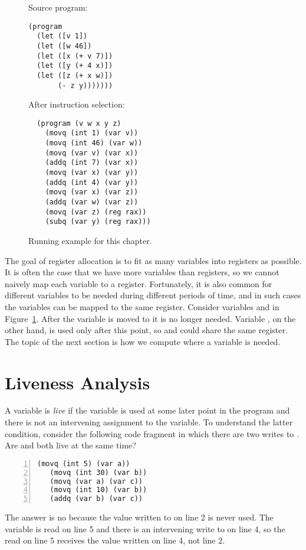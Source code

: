\documentclass[11pt]{book}
\begin{document}
\begin{figure}
\begin{minipage}{0.45\textwidth}
Source program:
\begin{lstlisting}
(program
  (let ([v 1])
  (let ([w 46])
  (let ([x (+ v 7)])
  (let ([y (+ 4 x)])
  (let ([z (+ x w)])
       (- z y)))))))
\end{lstlisting}
\end{minipage}
\begin{minipage}{0.45\textwidth}
After instruction selection:
\begin{lstlisting}
  (program (v w x y z)
    (movq (int 1) (var v))
    (movq (int 46) (var w))
    (movq (var v) (var x))
    (addq (int 7) (var x))
    (movq (var x) (var y))
    (addq (int 4) (var y))
    (movq (var x) (var z))
    (addq (var w) (var z))
    (movq (var z) (reg rax))
    (subq (var y) (reg rax)))
\end{lstlisting}
\end{minipage}
\caption{Running example for this chapter.}
\label{fig:reg-eg}
\end{figure}

The goal of register allocation is to fit as many variables into
registers as possible. It is often the case that we have more
variables than registers, so we cannot naively map each variable to a
register. Fortunately, it is also common for different variables to be
needed during different periods of time, and in such cases the
variables can be mapped to the same register.  Consider variables
 and  in Figure~\ref{fig:reg-eg}.  After the variable
 is moved to  it is no longer needed.  Variable
, on the other hand, is used only after this point, so
 and  could share the same register. The topic of the
next section is how we compute where a variable is needed.


\section{Liveness Analysis}
\label{sec:liveness-analysis}

A variable is \emph{live} if the variable is used at some later point
in the program and there is not an intervening assignment to the
variable.
%
To understand the latter condition, consider the following code
fragment in which there are two writes to . Are  and
 both live at the same time?
\begin{lstlisting}[numbers=left,numberstyle=\tiny]
   (movq (int 5) (var a))
   (movq (int 30) (var b))
   (movq (var a) (var c))
   (movq (int 10) (var b))
   (addq (var b) (var c))
\end{lstlisting}
The answer is no because the value  written to  on
line 2 is never used. The variable  is read on line 5 and
there is an intervening write to  on line 4, so the read on
line 5 receives the value written on line 4, not line 2.
\end{document}
